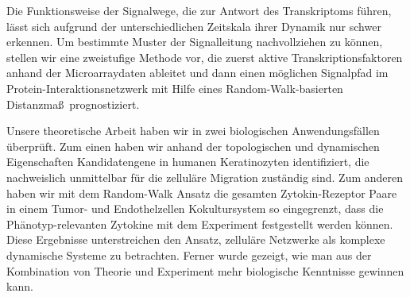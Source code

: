 Die Funktionsweise der Signalwege, die zur Antwort des
Transkriptoms f\"uhren, l\"asst sich aufgrund der 
unterschiedlichen
Zeitskala ihrer Dynamik nur schwer erkennen. Um bestimmte
Muster der Signalleitung nachvollziehen zu k\"onnen, stellen
wir eine zweistufige Methode vor, die zuerst aktive
Transkriptionsfaktoren anhand der Microarraydaten ableitet und
dann einen m\"oglichen Signalpfad im 
Protein-Interaktionsnetzwerk mit Hilfe eines 
Random-Walk-basierten Distanzma\ss \ prognostiziert.

Unsere theoretische Arbeit haben wir in zwei biologischen 
Anwendungsf\"allen \"uberpr\"uft. Zum einen haben wir
anhand der topologischen und dynamischen Eigenschaften
Kandidatengene in humanen Keratinozyten 
identifiziert, die nachweislich unmittelbar f\"ur die
zellul\"are Migration zust\"andig sind. Zum anderen
haben wir mit dem Random-Walk Ansatz 
die gesamten Zytokin-Rezeptor Paare in einem Tumor-
und Endothelzellen Kokultursystem so eingegrenzt,
dass die Ph\"anotyp-relevanten Zytokine mit dem Experiment
festgestellt werden k\"onnen. Diese Ergebnisse unterstreichen
den Ansatz, 
zellul\"are Netzwerke als komplexe dynamische
Systeme zu betrachten. Ferner wurde gezeigt, wie man
aus der Kombination von Theorie und Experiment mehr 
biologische Kenntnisse gewinnen kann.
